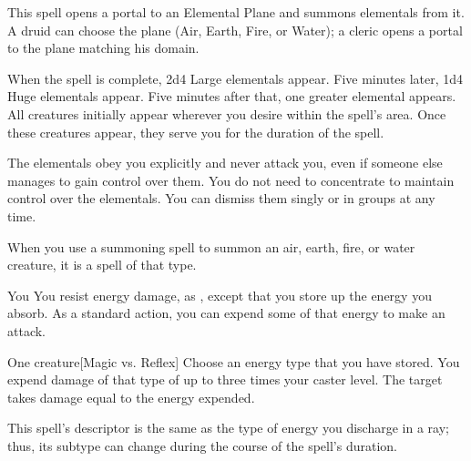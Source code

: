 \begin{spellheader}
    \spelldur{\durlong \dismissable}
\end{spellheader}
\begin{spelleffects}
    \spelleffect This spell opens a portal to an Elemental Plane and summons elementals from it. A druid can choose the plane (Air, Earth, Fire, or Water); a cleric opens a portal to the plane matching his domain.
    \par When the spell is complete, 2d4 Large elementals appear. Five minutes later, 1d4 Huge elementals appear. Five minutes after that, one greater elemental appears. All creatures initially appear wherever you desire within the spell's area. Once these creatures appear, they serve you for the duration of the spell.
    \par The elementals obey you explicitly and never attack you, even if someone else manages to gain control over them. You do not need to concentrate to maintain control over the elementals. You can dismiss them singly or in groups at any time.
\end{spelleffects}
\begin{spellfooter}
    \spellnotes When you use a summoning spell to summon an air, earth, fire, or water creature, it is a spell of that type.
\end{spellfooter}

\begin{spellheader}
\end{spellheader}
\begin{spelleffects}
    \begin{spelltarget}{You}
        \spelleffect You resist energy damage, as , except that you store up the energy you absorb. As a standard action, you can expend some of that energy to make an attack.
    \end{spelltarget}
    \spellrng{\rngclose}
    \begin{spelltarget}{One creature}[Magic vs. Reflex]
        \spelleffect Choose an energy type that you have stored. You expend damage of that type of up to three times your caster level.
        \spellsuccess The target takes damage equal to the energy expended.
    \end{spelltarget}
\end{spelleffects}
\begin{spellfooter}
    \spellnotes This spell's descriptor is the same as the type of energy you discharge in a ray; thus, its subtype can change during the course of the spell's duration.
\end{spellfooter}


